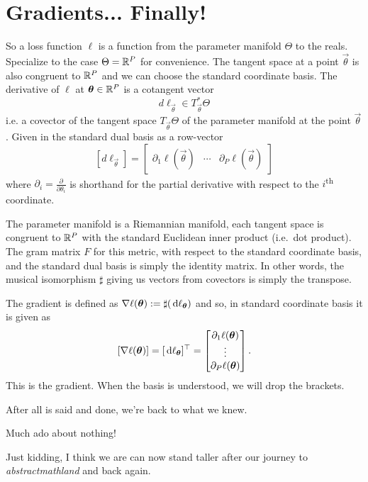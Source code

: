 \documentclass[12pt]{amsart}
\begin{document}
\section*{Gradients... Finally!}

So a loss function $\ell$ is a function from the parameter manifold $\Theta$ to the reals. Specialize to the case $\Theta = \mathbb{R}^P$ for convenience. The tangent space at a point $\vec{\theta}$ is also congruent to $\mathbb{R}^P$ and we can choose the standard coordinate basis. The derivative of $\ell$ at $\mathbf{\boldsymbol{\theta}} \in \mathbb{R}^P$ is a cotangent vector 
\[
	d\ell_{\vec{\theta}} \in T_{\vec{\theta}}^*\Theta
\]
i.e. a covector of the tangent space $T_{\vec{\theta}}\Theta$ of the parameter manifold at the point $\vec{\theta}$. Given in the standard dual basis as a row-vector
\[
	[d\ell_{\vec{\theta}}]  = \begin{bmatrix}
	\partial_1 \ell (\vec{\theta}) & \cdots & \partial_P \ell(\vec{\theta})
	\end{bmatrix}
\]
where $\partial_i= \frac{\partial}{\partial \theta_i}$ is shorthand for the partial derivative with respect to the $i$\textsuperscript{th} coordinate.

The parameter manifold is a Riemannian manifold, each tangent space is congruent to $\mathbb{R}^P$ with the standard Euclidean inner product (i.e.\ dot product). The gram matrix $F$ for this metric, with respect to the standard coordinate basis, and the standard dual basis is simply the identity matrix. In other words, the musical isomorphism $\sharp$ giving us vectors from covectors is simply the transpose.

The gradient is defined as $\nabla\ell(\mathbf{\boldsymbol{\theta}}) := \sharp (\,\mathrm{d} \ell_{\mathbf{\boldsymbol{\theta}}})$ and so, in standard coordinate basis it is given as
\[
	[\nabla \ell (\mathbf{\boldsymbol{\theta}}) ] = [\,\mathrm{d} \ell_{\mathbf{\boldsymbol{\theta}}}]^\top =  \begin{bmatrix}
	\partial_1 \ell(\mathbf{\boldsymbol{\theta}}) \\ 
	\vdots\\
	\partial_P \ell(\mathbf{\boldsymbol{\theta}})
	\end{bmatrix}.
\]
This is the gradient. When the basis is understood, we will drop the brackets. 

\noindent\hrulefill

After all is said and done, we're back to what we knew.

\medskip
Much ado about nothing! 

\medskip
Just kidding, I think we are can now stand taller after our journey to \emph{abstractmathland} and back again.
\end{document}
